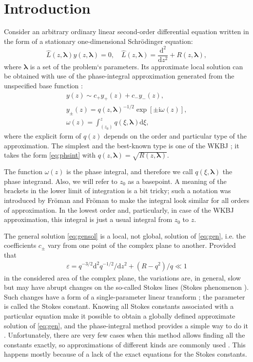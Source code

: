 \documentclass[atmp]{ipart_v1}
\def\LL{\widehat{L}}
\def\rmd{\mathrm{d}}
\def\rmi{\mathrm{i}}
\def\lmbd{\bm{\lambda}}
\def\w{\omega}
\newcommand\eref[1]{\eqref{#1}}
\newcommand\phsintgrnd[1][z]{q(#1,\lmbd)}
\newcommand\predexp[1][z]{q(#1,\lmbd)^{-1/2}}
\newcommand\phsintgrl[3][z]{\int_{#2}^{#3} \phsintgrnd[#1] \rmd #1}
\begin{document}
\section{Introduction \label{sec:intro}}
Consider an arbitrary ordinary linear second-order differential equation 
written in the form of a stationary one-dimensional Schr\"odinger equation:
\begin{equation}
\LL(z,\lmbd)y(z,\lmbd)=0, \quad \LL(z,\lmbd)=\frac{\rmd^2}{\rmd z^2} + R(z,\lmbd),   \label{eq:gen}
\end{equation}
where $\lmbd$ is a set of the problem`s parameters. Its approximate local solution can be
obtained with use of the phase-integral approximation generated 
from the unspecified base function \cite{frbook}:
\begin{subequations}
\label{eq:phsint}
\begin{eqnarray}
y(z) \sim c_+y_+(z) + c_-y_-(z), \label{eq:gensol}
\\
y_\pm(z) = \predexp \exp [\pm \rmi \w(z)], \label{eq:phbase}
\\
\w(z)=\phsintgrl[\xi]{(z_0)}{z}, \label{eq:phase}
\end{eqnarray}
\end{subequations}
where the explicit form of $q(z)$ depends on the order and particular type of the approximation.
The simplest and the best-known type is one of the WKBJ \cite{wkb1,wkb2,wkb3,wkbj}; 
it takes the form \eref{eq:phsint} with $\phsintgrnd = \sqrt{R(z,\lmbd)}$. 

The function $\w(z)$ is the phase integral, and therefore we call $\phsintgrnd[\xi]$ 
the phase integrand. Also, we will refer to $z_0$ as a basepoint.
A meaning of the brackets in the lower limit of integration is 
a bit tricky; such a notation was introduced by Fr\"oman and Fr\"oman \cite{frpaper} 
to make the integral look similar for all orders of approximation. In the lowest order and, 
particularly, in case of the WKBJ approximation, this integral is just a usual integral from $z_0$ to $z$.

The general solution \eref{eq:gensol} is a local, not global, solution of \eref{eq:gen}, i.e.
the coefficients $c_\pm$ vary from one point of the complex plane to another. Provided
that
\begin{eqnarray}
\varepsilon = q^{-3/2} \rmd^2 q^{-1/2}/\rmd z^2  + (R - q^2)/q \ll 1   \label{eq:cond}
\end{eqnarray}
in the considered area of the complex plane, the variations are, in general, slow
but may have abrupt changes on the so-called Stokes lines 
(Stokes phenomenon \cite{stokes,rwbook,heading,frbook}). Such 
changes have a form of a single-parameter linear transform \cite{heading}; 
the parameter is called the Stokes constant. 
Knowing all Stokes constants associated with a particular 
equation make it possible to obtain a globally defined approximate solution 
of \eref{eq:gen}, and the phase-integral method provides a simple 
way to do it \cite{heading,rwbook}. Unfortunately, there are very few 
cases when this method allows finding all the constants exactly, so approximations of different 
kinds are commonly used \cite{rwbook,ours}. This happens mostly because of a lack of the exact 
equations for the Stokes constants.
\end{document}
